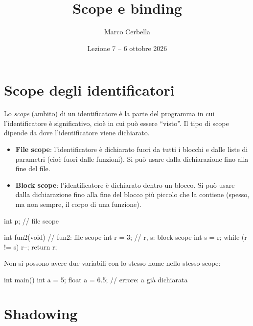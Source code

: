 \documentclass[11pt,a4paper]{article}
\title{Scope e binding}
\author{Marco Cerbella}
\date{Lezione 7 -- 6 ottobre 2026}
\begin{document}
\maketitle

\section{Scope degli identificatori}

\begin{definizione}
Lo \emph{scope} (ambito) di un identificatore è la parte del programma in cui
l'identificatore è significativo, cioè in cui può essere ``visto''. Il tipo di
scope dipende da dove l'identificatore viene dichiarato.
\end{definizione}

\begin{itemize}
    \item \textbf{File scope}: l'identificatore è dichiarato fuori da tutti i
          blocchi e dalle liste di parametri (cioè fuori dalle funzioni). Si
          può usare dalla dichiarazione fino alla fine del file.
    \item \textbf{Block scope}: l'identificatore è dichiarato dentro un blocco.
          Si può usare dalla dichiarazione fino alla fine del blocco più piccolo
          che la contiene (spesso, ma non sempre, il corpo di una funzione).
\end{itemize}

\begin{esempio}
\begin{codice}
int p;                   // file scope

int fun2(void) {         // fun2: file scope
    int r = 3;           // r, s: block scope
    int s = r;
    while (r != s) {
        r--;
    }
    return r;
}
\end{codice}
\end{esempio}

\begin{osservazione}
Non si possono avere due variabili con lo stesso nome nello stesso scope:
\begin{codice}
int main() {
    int a = 5;
    float a = 6.5;   // errore: a già dichiarata
}
\end{codice}
\end{osservazione}

\section{Shadowing}
\end{document}
